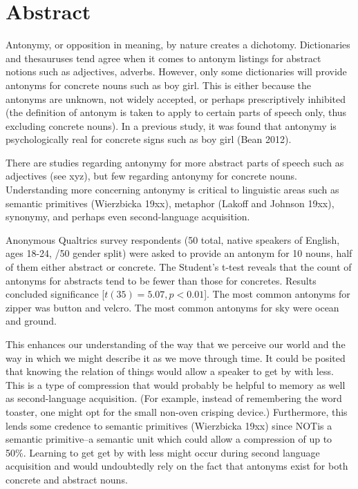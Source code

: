 \clearpage
\section {Abstract}
Antonymy, or opposition in meaning, by nature creates a dichotomy.  Dictionaries and thesauruses tend agree when it comes to antonym listings for abstract notions such as adjectives, adverbs.  However, only some dictionaries will provide antonyms for concrete nouns such as boy \opp girl.  This is either because the antonyms are unknown, not widely accepted, or perhaps prescriptively inhibited (the definition of antonym is taken to apply to certain parts of speech only, thus excluding concrete nouns).  In a previous study, it was found that antonymy is psychologically real for concrete signs such as boy \opp girl (Bean 2012).  

There are studies regarding antonymy for more abstract parts of speech such as adjectives (see xyz), but few regarding antonymy for concrete nouns.  Understanding more concerning antonymy is critical to linguistic areas such as semantic primitives (Wierzbicka 19xx), metaphor (Lakoff and Johnson 19xx), synonymy, and perhaps even second-language acquisition.  

Anonymous Qualtrics survey respondents (50 total, native speakers of English, ages 18-24, /50 gender split) were asked to provide an antonym for 10 nouns, half of them either abstract or concrete.  The Student’s t-test reveals that the count of antonyms for abstracts tend to be fewer than those for concretes.  Results concluded significance [$t(35) = 5.07, p < 0.01$].  The most common antonyms for zipper was button and velcro.  The most common antonyms for sky were ocean and ground\footnotemark.

This enhances our understanding of the way that we perceive our world and the way in which we might describe it as we move through time.  It could be posited that knowing the relation of things would allow a speaker to get by with less. This is a type of compression that would probably be helpful to memory as well as second-language acquisition.  (For example, instead of remembering the word toaster, one might opt for the small non-oven crisping device\footnotemark.)  Furthermore, this lends some credence to semantic primitives (Wierzbicka 19xx) since NOT\footnotemark is a semantic primitive--a semantic unit which could allow a compression of up to 50\%.  Learning to get get by with less might occur during second language acquisition and would undoubtedly rely on the fact that antonyms exist for both concrete and abstract nouns.

